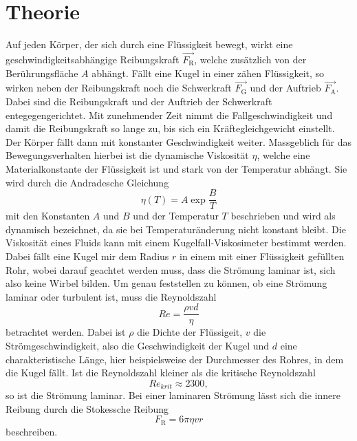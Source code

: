 \section{Theorie}
\label{sec:Theorie}
Auf jeden Körper, der sich durch eine Flüssigkeit bewegt, wirkt eine
geschwindigkeitsabhängige Reibungskraft $\vec{F_\text{R}}$, welche zusätzlich
von der Berührungsfläche $A$ abhängt. Fällt eine Kugel in einer zähen Flüssigkeit,
so wirken neben der Reibungskraft noch die Schwerkraft $\vec{F_\text{G}}$ und
der Auftrieb $\vec{F_\text{A}}$. Dabei sind die Reibungskraft und der Auftrieb
der Schwerkraft entegegengerichtet. Mit zunehmender Zeit nimmt die Fallgeschwindigkeit
und damit die Reibungskraft so lange zu, bis sich ein Kräftegleichgewicht einstellt.
Der Körper fällt dann mit konstanter Geschwindigkeit weiter.
Massgeblich für das Bewegungsverhalten hierbei ist die dynamische Viskosität
$\eta$, welche eine Materialkonstante der Flüssigkeit ist und stark von der
Temperatur abhängt. Sie wird durch die Andradesche Gleichung
\begin{equation}
  \eta(T) = A \exp{\frac{B}{T}}
  \label{eqn:andradesche_gleichung}
\end{equation}
mit den Konstanten $A$ und $B$ und der Temperatur $T$ beschrieben und wird als
dynamisch bezeichnet, da sie bei Temperaturänderung nicht konstant bleibt.
Die Viskosität eines Fluids kann mit einem Kugelfall-Viskosimeter bestimmt werden.
Dabei fällt eine Kugel mir dem Radius $r$ in einem mit einer Flüssigkeit
gefüllten Rohr, wobei darauf geachtet werden muss, dass die Strömung laminar ist,
sich also keine Wirbel bilden. Um genau feststellen zu können, ob eine Strömung
laminar oder turbulent ist, muss die Reynoldszahl
\begin{equation}
  Re = \frac{\rho v d}{\eta}
  \label{eqn:reynoldszahl}
\end{equation}
betrachtet werden. Dabei ist $\rho$ die Dichte der Flüssigeit, $v$ die
Strömgeschwindigkeit, also die Geschwindigkeit der Kugel und $d$ eine charakteristische
Länge, hier beispielsweise der Durchmesser des Rohres, in dem die Kugel fällt.
Ist die Reynoldszahl kleiner als die kritische Reynoldszahl
\begin{equation*}
  Re_{krit} \approx 2300,
\end{equation*}
so ist die Strömung laminar. Bei einer laminaren Strömung lässt sich die innere
Reibung durch die Stokessche Reibung
\begin{equation}
  F_\text{R} = 6 \pi \eta v r
  \label{eqn:stokes}
\end{equation}
beschreiben.

